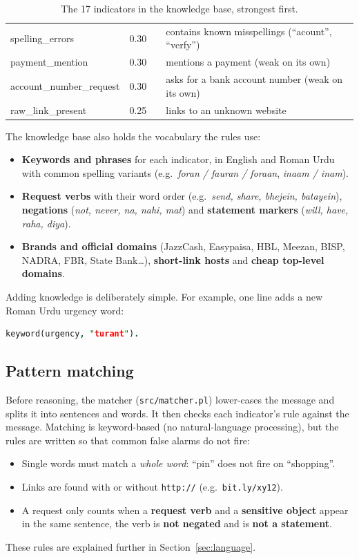 \documentclass[11pt,a4paper]{article}
\newcommand{\pl}[1]{\texttt{#1}}          %
\begin{document}
\begin{table}[H]
\begin{tabularx}{\linewidth}{>{\ttfamily}l c c X}
spelling\_errors        & 0.30 &  & contains known misspellings (``acount'', ``verfy'') \\
payment\_mention        & 0.30 &  & mentions a payment (weak on its own) \\
account\_number\_request& 0.30 &  & asks for a bank account number (weak on its own) \\
raw\_link\_present      & 0.25 &  & links to an unknown website \\
\bottomrule
\end{tabularx}
\caption{The 17 indicators in the knowledge base, strongest first.}
\label{tab:indicators}
\end{table}

\noindent The knowledge base also holds the vocabulary the rules use:
\begin{itemize}
  \item \textbf{Keywords and phrases} for each indicator, in English and Roman Urdu with common spelling
        variants (e.g.\ \emph{foran / fauran / foraan}, \emph{inaam / inam}).
  \item \textbf{Request verbs} with their word order (e.g.\ \emph{send, share, bhejein, batayein}),
        \textbf{negations} (\emph{not, never, na, nahi, mat}) and \textbf{statement markers}
        (\emph{will, have, raha, diya}).
  \item \textbf{Brands and official domains} (JazzCash, Easypaisa, HBL, Meezan, BISP, NADRA, FBR,
        State Bank\ldots), \textbf{short-link hosts} and \textbf{cheap top-level domains}.
\end{itemize}
Adding knowledge is deliberately simple. For example, one line adds a new Roman Urdu urgency word:
\begin{lstlisting}[language=Prolog]
keyword(urgency, "turant").
\end{lstlisting}

\subsection{Pattern matching}
Before reasoning, the matcher (\pl{src/matcher.pl}) lower-cases the message and splits it into
sentences and words. It then checks each indicator's rule against the message. Matching is
keyword-based (no natural-language processing), but the rules are written so that common
false alarms do not fire:
\begin{itemize}
  \item Single words must match a \emph{whole word}: ``pin'' does not fire on ``shopping''.
  \item Links are found with or without \texttt{http://} (e.g.\ \texttt{bit.ly/xy12}).
  \item A request only counts when a \textbf{request verb} and a \textbf{sensitive object} appear in the
        same sentence, the verb is \textbf{not negated} and is \textbf{not a statement}.
\end{itemize}
These rules are explained further in Section~\ref{sec:language}.
\end{document}
